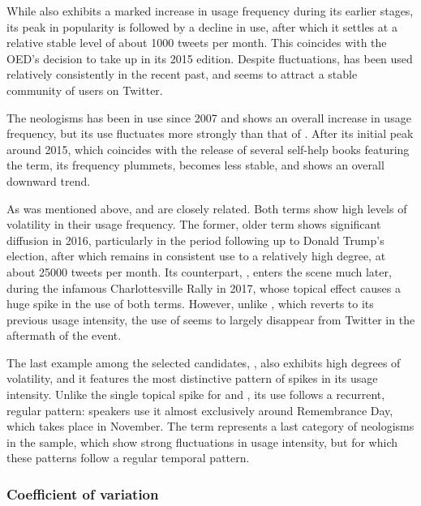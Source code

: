 \documentclass[
  a4paper,
  abstract=on,
  captions=tableabove
  ]{scrartcl}
\begin{document}
        While  also exhibits a marked increase in usage frequency during its earlier stages, its peak in popularity is followed by a decline in use, after which it settles at a relative stable level of about \num{1000} tweets per month. This coincides with the OED's decision to take up  in its 2015 edition. Despite fluctuations,  has been used relatively consistently in the recent past, and seems to attract a stable community of users on Twitter.

        The neologisms  has been in use since 2007 and shows an overall increase in usage frequency, but its use fluctuates more strongly than that of . After its initial peak around 2015, which coincides with the release of several self-help books featuring the term, its frequency plummets, becomes less stable, and shows an overall downward trend.

        As was mentioned above,  and  are closely related. Both terms show high levels of volatility in their usage frequency. The former, older term shows significant diffusion in 2016, particularly in the period following up to Donald Trump's election, after which  remains in consistent use to a relatively high degree, at about \num{25000} tweets per month. Its counterpart, , enters the scene much later, during the infamous Charlottesville Rally in 2017, whose topical effect causes a huge spike in the use of both terms. However, unlike , which reverts to its previous usage intensity, the use of  seems to largely disappear from Twitter in the aftermath of the event.

        The last example among the selected candidates, , also exhibits high degrees of volatility, and it features the most distinctive pattern of spikes in its usage intensity. Unlike the single topical spike for  and , its use follows a recurrent, regular pattern: speakers use it almost exclusively around Remembrance Day, which takes place in November. The term  represents a last category of neologisms in the sample, which show strong fluctuations in usage intensity, but for which these patterns follow a regular temporal pattern. 


    \subsubsection{Coefficient of variation}
      \label{subsubsec:coef-var}
\end{document}
